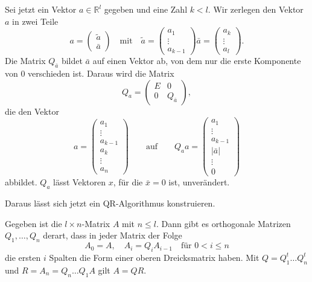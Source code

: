 Sei jetzt ein Vektor $a\in\mathbb R^l$ gegeben und eine Zahl $k< l$.
Wir zerlegen den Vektor $a$ in zwei Teile
\[
a = \begin{pmatrix}\tilde{a}\\\bar{a}\end{pmatrix}
\quad\text{mit}\quad
\tilde{a}=\begin{pmatrix}a_1\\\vdots\\a_{k-1}\end{pmatrix}
\bar{a}=\begin{pmatrix}a_k\\\vdots \\a_l\end{pmatrix}.
\]
Die Matrix $Q_{\bar{a}}$ bildet $\bar{a}$ auf einen Vektor ab, von dem
nur die erste Komponente von $0$ verschieden ist.
Daraus wird die Matrix
\begin{equation}
Q_a
=
\begin{pmatrix} E&0\\0&Q_{\bar{a}}\end{pmatrix},
\label{buch:eqn:Qa}
\end{equation}
die den Vektor
\[
a=\begin{pmatrix}
a_1\\\vdots\\ a_{k-1}\\a_{k}\\\vdots\\a_n
\end{pmatrix}
\qquad\text{auf}\qquad
Q_aa
=
\begin{pmatrix}a_1\\\vdots\\a_{k-1}\\ |\bar{a}|\\\vdots\\0\end{pmatrix}
\]
abbildet.
$Q_a$ lässt Vektoren $x$, für die $\bar{x}=0$ ist, unverändert.

Daraus lässt sich jetzt ein QR-Algorithmus konstruieren.

\begin{satz}
Gegeben ist die $l\times n$-Matrix $A$ mit $n\le l$.
Dann gibt es orthogonale Matrizen $Q_1,\dots,Q_n$ derart, dass in
jeder Matrix der Folge
\[
A_0 = A, \quad A_{i} = Q_{i}A_{i-1}\quad\text{für $0<i\le n$}
\]
die ersten $i$ Spalten die Form einer oberen Dreicksmatrix haben.
Mit $Q=Q_1^t\dots Q_n^t$ und $R=A_n=Q_n\dots Q_1A$ gilt $A=QR$.
\end{satz}

